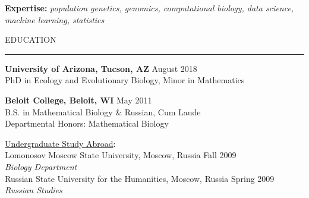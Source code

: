 \documentclass{resume} %
\renewenvironment{rSection}[1]{
\sectionskip
\textcolor{RoyalPurple}{\MakeUppercase{#1}}
\sectionlineskip
\hrule
\begin{list}{}{
\setlength{\leftmargin}{1.5em}
}
\item[]
}{
\end{list}
}
\begin{document}

\textcolor{RoyalPurple}{\bf Expertise:}
\textcolor{RoyalPurple}{\em population genetics, genomics, computational biology, data science, machine learning, statistics}

\begin{rSection}{Education}

{\bf University of Arizona, Tucson, AZ} \hfill August 2018 \\ 
PhD in Ecology and Evolutionary Biology, Minor in Mathematics 

{\bf Beloit College, Beloit, WI} \hfill May 2011 \\ 
B.S. in Mathematical Biology \& Russian, Cum Laude \\
Departmental Honors: Mathematical Biology

\underline{Undergraduate Study Abroad}:\\
\hspace*{0.75cm} {Lomonosov Moscow State University, Moscow, Russia} \hfill Fall 2009 \\ 
\hspace*{0.75cm} {\em Biology Department}\\
\hspace*{0.75cm} {Russian State University for the Humanities, Moscow, Russia} \hfill Spring 2009 \\ 
\hspace*{0.75cm} {\em Russian Studies}

\end{rSection}

\end{document}
